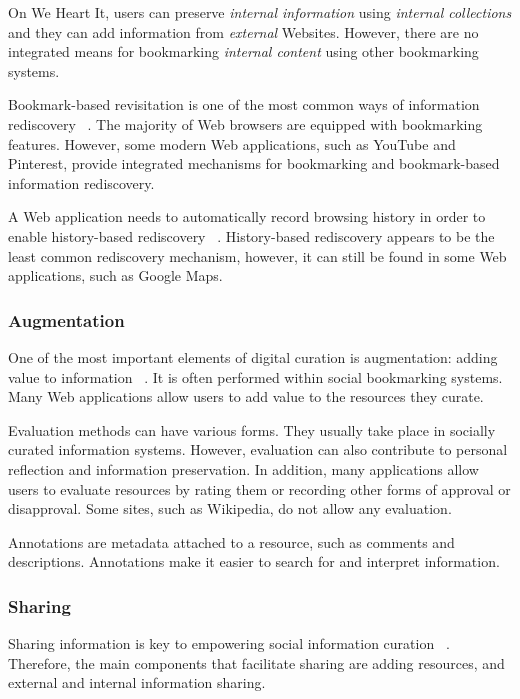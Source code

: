 {{{On We Heart It, users can preserve \textit{internal  information} using \textit{internal collections} and they can add information from \textit{external} Websites. However, there are no integrated means for bookmarking \textit{internal content} using other bookmarking systems.  


Bookmark-based revisitation is one of the most common ways of information rediscovery ~\cite{abrams}. The majority of Web browsers are equipped with bookmarking features. However, some modern Web applications, such as YouTube and Pinterest, provide integrated mechanisms for bookmarking and bookmark-based information rediscovery. 

A Web application needs to automatically record browsing history in order to enable history-based rediscovery ~\cite{tauscher}. History-based rediscovery appears to be the least common rediscovery mechanism, however, it can still be found in some Web applications, such as Google Maps.
} %

{\subsubsection{Augmentation}
One of the most important elements of digital curation is augmentation: adding value to information ~\cite{beagrie, wittaker}. It is often performed within social bookmarking systems. Many Web applications allow users to add value to the resources they curate. 

Evaluation methods can have various forms. They usually take place in socially curated information systems. However, evaluation can also contribute to personal reflection and information preservation. In addition, many applications allow users to evaluate resources by rating them or recording other forms of approval or disapproval. Some sites, such as Wikipedia, do not allow any evaluation. 

Annotations are metadata attached to a resource, such as comments and descriptions. Annotations make it easier to search for and interpret information. 
} %

{\subsubsection{Sharing}
Sharing information is key to empowering social information curation ~\cite{beagrie}. Therefore, the main components that facilitate sharing are adding resources, and external and internal information sharing.

}}}
